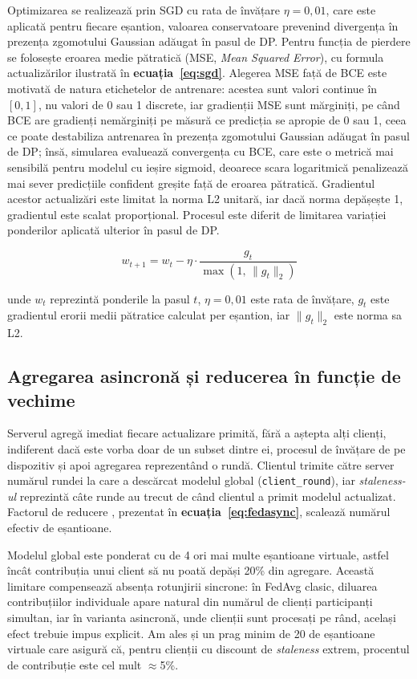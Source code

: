 \documentclass[12pt,a4paper]{report}
\begin{document}
Optimizarea se realizează prin SGD cu rata de învățare $\eta = 0{,}01$, care este aplicată pentru fiecare eșantion, valoarea conservatoare prevenind divergența în prezența zgomotului Gaussian adăugat în pasul de DP. Pentru funcția de pierdere se folosește eroarea medie pătratică (MSE, \textit{Mean Squared Error}), cu formula actualizărilor ilustrată în \textbf{ecuația~\ref{eq:sgd}}. Alegerea MSE față de BCE este motivată de natura etichetelor de antrenare: acestea sunt valori continue în $[0, 1]$, nu valori de 0 sau 1 discrete, iar gradienții MSE sunt mărginiți, pe când BCE are gradienți nemărginiți pe măsură ce predicția se apropie de 0 sau 1, ceea ce poate destabiliza antrenarea în prezența zgomotului Gaussian adăugat în pasul de DP; însă, simularea evaluează convergența cu BCE, care este o metrică mai sensibilă pentru modelul cu ieșire sigmoid, deoarece scara logaritmică penalizează mai sever predicțiile confident greșite față de eroarea pătratică. Gradientul acestor actualizări este limitat la norma L2 unitară, iar dacă norma depășește 1, gradientul este scalat proporțional. Procesul este diferit de limitarea variației ponderilor aplicată ulterior în pasul de DP.

\begin{equation}
w_{t+1} = w_t - \eta \cdot \frac{g_t}{\max\!\left(1,\, \|g_t\|_2\right)}
\label{eq:sgd}
\end{equation}

\noindent unde $w_t$ reprezintă ponderile la pasul $t$, $\eta = 0{,}01$ este rata de învățare, $g_t$ este gradientul erorii medii pătratice calculat per eșantion, iar $\|g_t\|_2$ este norma sa L2.

\subsection{Agregarea asincronă și reducerea în funcție de vechime}

Serverul agregă imediat fiecare actualizare primită, fără a aștepta alți clienți, indiferent dacă este vorba doar de un subset dintre ei, procesul de învățare de pe dispozitiv și apoi agregarea reprezentând o rundă. Clientul trimite către server numărul rundei la care a descărcat modelul global (\texttt{client\_round}), iar \textit{staleness-ul} reprezintă câte runde au trecut de când clientul a primit modelul actualizat. Factorul de reducere \cite{xie2019fedasync}, prezentat în \textbf{ecuația~\ref{eq:fedasync}}, scalează numărul efectiv de eșantioane.

Modelul global este ponderat cu de 4 ori mai multe eșantioane virtuale, astfel încât contribuția unui client să nu poată depăși 20\% din agregare. Această limitare compensează absența rotunjirii sincrone: în FedAvg clasic, diluarea contribuțiilor individuale apare natural din numărul de clienți participanți simultan, iar în varianta asincronă, unde clienții sunt procesați pe rând, același efect trebuie impus explicit. Am ales și un prag minim de 20 de eșantioane virtuale care asigură că, pentru clienții cu discount de \textit{staleness} extrem, procentul de contribuție este cel mult $\approx$5\%.
\end{document}
